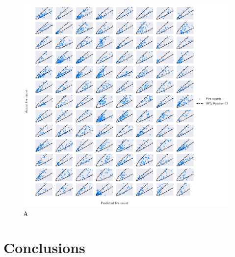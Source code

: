 \documentclass{svjour3}
\begin{document}
    \begin{figure}[htb] \centering
    \includegraphics[width=1\textwidth]{figures/dispersion.pdf}
    \caption{A }
    \label{fig:dispersion}
    \end{figure}
  
  
  
  
  
  \section{Conclusions}
  

\clearpage


\end{document}
